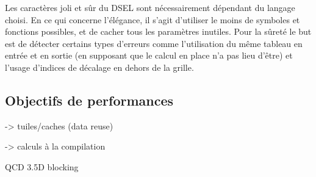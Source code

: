 Les caractères joli et sûr du DSEL sont nécessairement dépendant du langage choisi. En ce qui concerne l'élégance, il s'agit d'utiliser le moins de symboles et fonctions possibles, et de cacher tous les paramètres inutiles. Pour la sûreté le but est de détecter certains types d'erreurs comme l'utilisation du même tableau en entrée et en sortie (en supposant que le calcul en place n'a pas lieu d'être) et l'usage d'indices de décalage en dehors de la grille.

\subsection{Objectifs de performances}


-> tuiles/caches (data reuse)

-> calculs à la compilation


QCD \cite{Art1}
3.5D blocking \cite{Art11}

